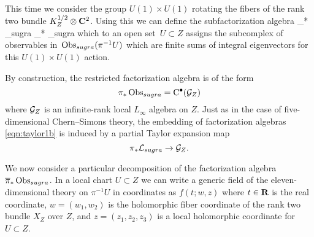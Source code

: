 This time we consider the group $U(1) \times U(1)$ rotating the fibers of the rank two bundle $K_Z^{1/2} \otimes \mathbf{C}^2$. 
Using this we can define the subfactorization algebra 
\beqn\label{eqn:taylor1b}
\Bar{\pi}_* \Obs_{sugra} \subset \pi_* \Obs_{sugra}
\eeqn
which to an open set~$U \subset Z$ assigns the subcomplex of observables in~$\operatorname{Obs}_{sugra} (\pi^{-1} U)$ which are finite sums of integral eigenvectors for this $U(1) \times U(1)$ action.

By construction, the restricted factorization algebra is of the form
\[
\pi_*\operatorname{Obs}_{sugra} = {\rm C}^\bullet(\mathcal G_Z) 
\]
where $\mathcal G_Z$ is an infinite-rank local $L_\infty$ algebra on $Z$. 
Just as in the case of five-dimensional Chern--Simons theory, the embedding of factorization algebras \eqref{eqn:taylor1b} is induced by a partial Taylor expansion map
\[
\pi_* \mathcal L_{sugra} \to \mathcal G_Z .
\]

\parsec[s:cstarfive]

We now consider a particular decomposition of the factorization algebra $\overline{\pi}_* \operatorname{Obs}_{sugra}$. 
In a local chart $U \subset Z$ we can write a generic field of the eleven-dimensional theory on $\pi^{-1} U$ in coordinates as $f(t;w,z)$ where $t \in \mathbf{R}$ is the real coordinate, $w=(w_1,w_2)$ is the holomorphic fiber coordinate of the rank two bundle $X_Z$ over $Z$, and $z = (z_1,z_2,z_3)$ is a local holomorphic coordinate for $U \subset Z$. 

%
%
%
%

